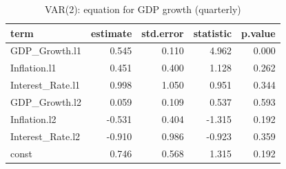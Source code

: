\begin{table}

\caption{\label{tab:var-summary}VAR(2): equation for GDP growth (quarterly)}
\centering
\begin{tabular}[t]{lrrrr}
\toprule
term & estimate & std.error & statistic & p.value\\
\midrule
GDP\_Growth.l1 & 0.545 & 0.110 & 4.962 & 0.000\\
Inflation.l1 & 0.451 & 0.400 & 1.128 & 0.262\\
Interest\_Rate.l1 & 0.998 & 1.050 & 0.951 & 0.344\\
GDP\_Growth.l2 & 0.059 & 0.109 & 0.537 & 0.593\\
Inflation.l2 & -0.531 & 0.404 & -1.315 & 0.192\\
\addlinespace
Interest\_Rate.l2 & -0.910 & 0.986 & -0.923 & 0.359\\
const & 0.746 & 0.568 & 1.315 & 0.192\\
\bottomrule
\end{tabular}
\end{table}
